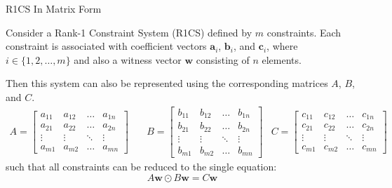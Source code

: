 \documentclass{zkdl-presentation-template}
\begin{document}
    \begin{frame}{R1CS In Matrix Form}
        \begin{theorem} 
            Consider a Rank-1 Constraint System (R1CS) defined by $m$ constraints. Each constraint is
            associated with coefficient vectors $\mathbf{a}_i$, $\mathbf{b}_i$, and $\mathbf{c}_i$, where $i \in \{1, 2, \dots, m\}$ and
            also a witness vector $\mathbf{w}$ consisting of $n$ elements.
        
            Then this system can also be represented using the corresponding matrices $A$, $B$, and $C$.
            {\scriptsize
            \begin{align*}
                A = \begin{bmatrix}
                    a_{11} & a_{12} & \dots & a_{1n} \\
                    a_{21} & a_{22} & \dots & a_{2n} \\
                    \vdots & \vdots & \ddots & \vdots \\
                    a_{m1} & a_{m2} & \dots & a_{mn}
                \end{bmatrix} & \quad
                B = \begin{bmatrix}
                    b_{11} & b_{12} & \dots & b_{1n} \\
                    b_{21} & b_{22} & \dots & b_{2n} \\
                    \vdots & \vdots & \ddots & \vdots \\
                    b_{m1} & b_{m2} & \dots & b_{mn}
                \end{bmatrix} & 
                C = \begin{bmatrix}
                    c_{11} & c_{12} & \dots & c_{1n} \\
                    c_{21} & c_{22} & \dots & c_{2n} \\
                    \vdots & \vdots & \ddots & \vdots \\
                    c_{m1} & c_{m2} & \dots & c_{mn}
                \end{bmatrix}
            \end{align*}
            }
            such that all constraints can be reduced to the single equation:
            \begin{equation*}
                A\mathbf{w} \odot B\mathbf{w} = C\mathbf{w}
            \end{equation*}
        \end{theorem}
    \end{frame}
\end{document}
